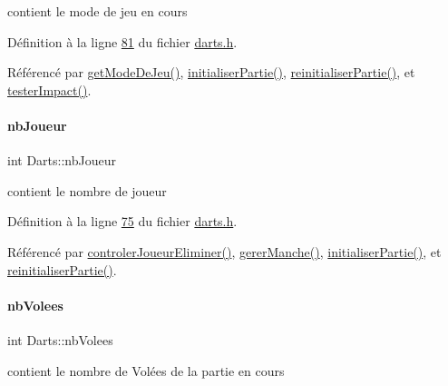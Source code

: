 contient le mode de jeu en cours 



Définition à la ligne \hyperlink{darts_8h_source_l00081}{81} du fichier \hyperlink{darts_8h_source}{darts.\+h}.



Référencé par \hyperlink{darts_8cpp_source_l00099}{get\+Mode\+De\+Jeu()}, \hyperlink{darts_8cpp_source_l00144}{initialiser\+Partie()}, \hyperlink{darts_8cpp_source_l00184}{reinitialiser\+Partie()}, et \hyperlink{darts_8cpp_source_l00246}{tester\+Impact()}.

\mbox{\label{class_darts_ac5ae0e3546d00f59adba76c4ece71725}} 
\paragraph{\texorpdfstring{nb\+Joueur}{nbJoueur}}
{\footnotesize\ttfamily int Darts\+::nb\+Joueur\hspace{0.3cm}{\ttfamily [private]}}



contient le nombre de joueur 



Définition à la ligne \hyperlink{darts_8h_source_l00075}{75} du fichier \hyperlink{darts_8h_source}{darts.\+h}.



Référencé par \hyperlink{darts_8cpp_source_l00349}{controler\+Joueur\+Eliminer()}, \hyperlink{darts_8cpp_source_l00303}{gerer\+Manche()}, \hyperlink{darts_8cpp_source_l00144}{initialiser\+Partie()}, et \hyperlink{darts_8cpp_source_l00184}{reinitialiser\+Partie()}.

\mbox{\label{class_darts_ae73a0b876ca354c7abd0d39db15c94fa}} 
\paragraph{\texorpdfstring{nb\+Volees}{nbVolees}}
{\footnotesize\ttfamily int Darts\+::nb\+Volees\hspace{0.3cm}{\ttfamily [private]}}



contient le nombre de Volées de la partie en cours 



